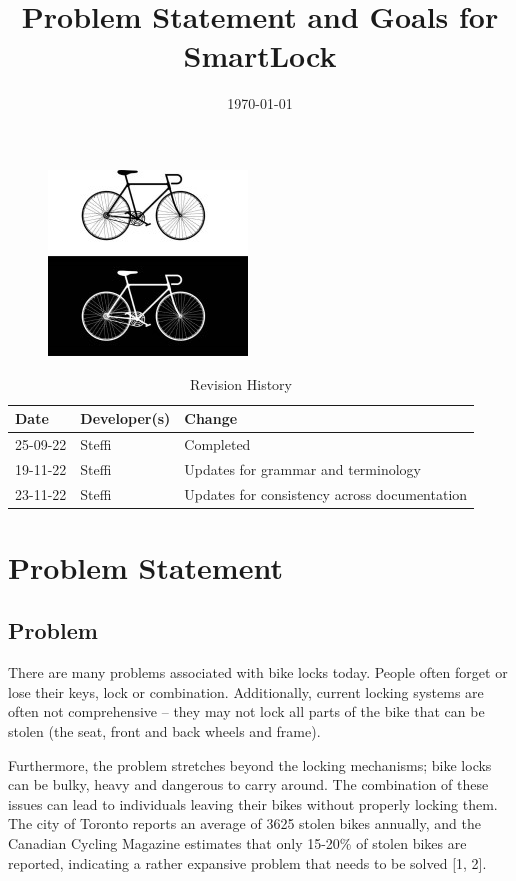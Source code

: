 \documentclass{article}
\title{Problem Statement and Goals for SmartLock\\\progname}
\author{\authname}
\date{\today}
\begin{document}
\maketitle
\thispagestyle{empty}
\begin{figure}[h!]
  \centering
  \includegraphics[width=0.4\linewidth]{../BikeLogo.jpg}
\end{figure}

\newpage
{}
\begin{table}[hp]
\caption{Revision History} \label{TblRevisionHistory}
\begin{tabularx}{\textwidth}{llX}
\toprule
\textbf{Date} & \textbf{Developer(s)} & \textbf{Change}\\
\midrule
25-09-22 & Steffi & Completed\\
19-11-22 & Steffi & Updates for grammar and terminology\\
23-11-22 & Steffi & Updates for consistency across documentation\\
\bottomrule
\end{tabularx}
\end{table}

\newpage
\tableofcontents

\newpage
{}
\section{Problem Statement}

\subsection{Problem}

There are many problems associated with bike locks today.  People often forget or lose their keys, lock or combination.  Additionally, current locking systems are often not comprehensive – they may not lock all parts of the bike that can be stolen (the seat, front and back wheels and frame). 

Furthermore, the problem stretches beyond the locking mechanisms; bike locks can be bulky, heavy and dangerous to carry around.  The combination of these issues can lead to individuals leaving their bikes without properly locking them.  The city of Toronto reports an average of 3625 stolen bikes annually, and the Canadian Cycling Magazine estimates that only 15-20\% of stolen bikes are reported, indicating a rather expansive problem that needs to be solved [1, 2]. 
\end{document}
